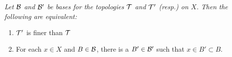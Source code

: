  {\itshape
Let $\mathcal{B}$ and $\mathcal{B'}$ be bases for the topologies
$\mathcal{T}$ and $\mathcal{T'}$ (resp.) on $X$. Then the following
are equivalent:
\begin{enumerate}
\item $\mathcal{T'}$ is finer than $\mathcal{T}$
\item For each $x\in X$ and $B\in\mathcal{B}$, there is a
  $B'\in\mathcal{B'}$ such that $x\in B'\subset B$.
\end{enumerate}
}
